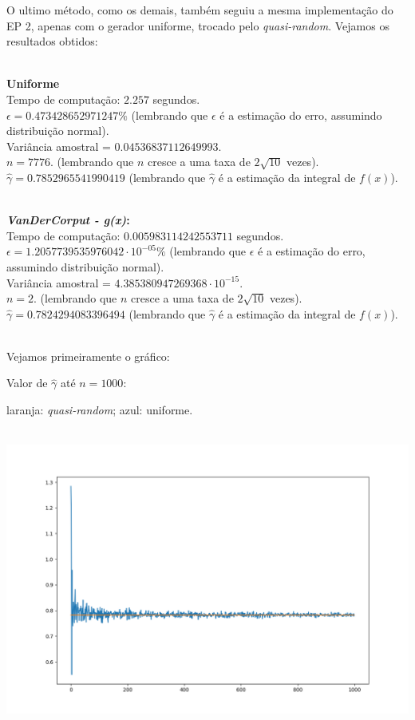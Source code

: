 \documentclass[pt12]{article}
\begin{document}
O ultimo método, como os demais, também seguiu a mesma implementação do EP 2, apenas com o gerador uniforme, trocado pelo \textit{quasi-random}. Vejamos os resultados obtidos:\\
\ 

\textbf{Uniforme}\\
\noindent Tempo de computação: $2.257$ segundos.\\
\noindent $\epsilon = 0.473428652971247\%$ (lembrando que $\epsilon$ é a estimação do erro, assumindo distribuição normal).\\
\noindent Variância amostral = $0.04536837112649993$.\\
\noindent $n = 7776$. (lembrando que $n$ cresce a uma taxa de $2\sqrt{10}$ vezes).\\
\noindent $\hat{\gamma} = 0.7852965541990419$ (lembrando que $\hat{\gamma}$ é a estimação da integral de $f(x)$).\\
\ 

\textbf{\textit{VanDerCorput - g(x)}:}\\
\noindent Tempo de computação: $0.005983114242553711$ segundos.\\
\noindent $\epsilon = 1.2057739535976042\cdot 10^{-05}\%$ (lembrando que $\epsilon$ é a estimação do erro, assumindo distribuição normal).\\
\noindent Variância amostral = $4.385380947269368\cdot 10^{-15}$.\\
\noindent $n = 2$. (lembrando que $n$ cresce a uma taxa de $2\sqrt{10}$ vezes).\\
\noindent $\hat{\gamma} = 0.7824294083396494$ (lembrando que $\hat{\gamma}$ é a estimação da integral de $f(x)$).\\
\ 

Vejamos primeiramente o gráfico:\\
\newpage

Valor de $\hat{\gamma}$ até $n=1000$:\\
\indent \begin{small}laranja: \textit{quasi-random}; azul: uniforme.\end{small}\\
\includegraphics[scale=0.6]{conver_var.png}
\ 
\end{document}
